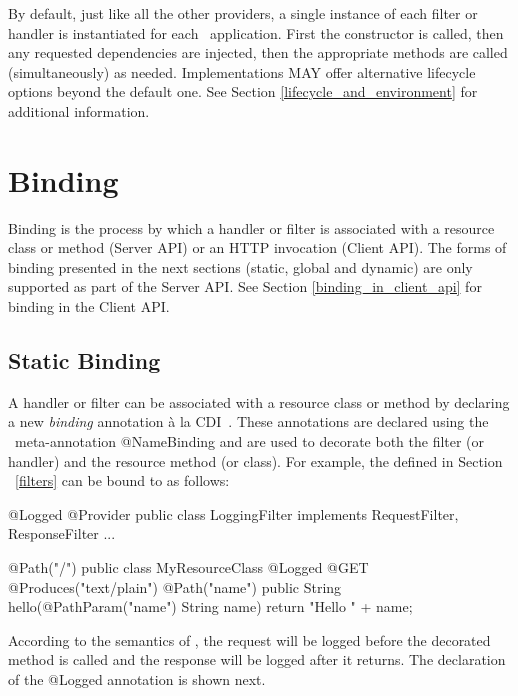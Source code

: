 By default, just like all the other providers, a single instance of each filter or handler is instantiated for each \jaxrs\ application. First the constructor is called, then any requested dependencies are injected, then the appropriate methods are called (simultaneously) as needed. Implementations MAY offer alternative lifecycle options beyond the default one. See Section \ref{lifecycle_and_environment} for additional information.

\section{Binding}

Binding is the process by which a handler or filter is associated with a resource class or method (Server API) or an HTTP invocation (Client API). The forms of binding presented in the next sections (static, global and dynamic) are only supported as part of the Server API. See Section \ref{binding_in_client_api} for binding in the Client API.

\subsection{Static Binding}

A handler or filter can be associated with a resource class or method by declaring a new \emph{binding} annotation \`{a} la CDI~\cite{jsr299}. These annotations are declared using the \jaxrs\ meta-annotation @NameBinding and are used to decorate both the filter (or handler) and the resource method (or class). For example, the  defined in Section ~\ref{filters} can be bound to  as follows:

\begin{listing}{1}
@Logged
@Provider
public class LoggingFilter implements RequestFilter, ResponseFilter {
    ...
}
\end{listing}

\begin{listing}{1}
@Path("/")
public class MyResourceClass {
    @Logged
    @GET
    @Produces("text/plain")
    @Path("{name}")
    public String hello(@PathParam("name") String name) {
        return "Hello " + name;
    }
}
\end{listing}

According to the semantics of , the request will be logged before the decorated method is called and the response will be logged after it returns. The declaration of the @Logged annotation is shown next.


